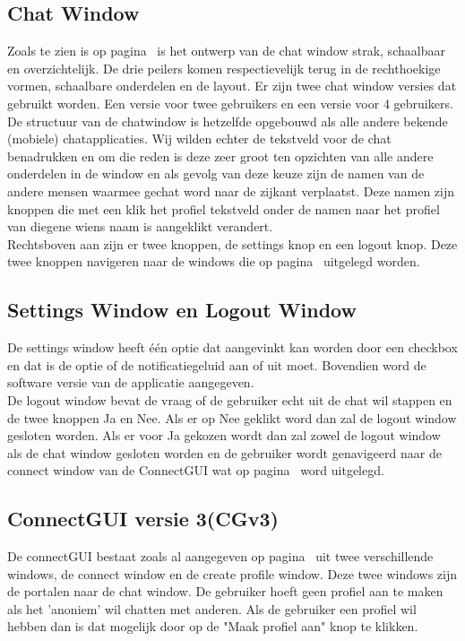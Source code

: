 \documentclass[12pt]{article}
\begin{document}
\subsection*{Chat Window}
\label{Chat Window}
Zoals te zien is op pagina~\pageref{ChGv3Chat} is het ontwerp van de chat window strak, schaalbaar en overzichtelijk. De drie peilers komen respectievelijk terug in de rechthoekige vormen, schaalbare onderdelen en de layout. Er zijn twee chat window versies dat gebruikt worden. Een versie voor twee gebruikers en een versie voor 4 gebruikers.\\

\noindent De structuur van de chatwindow is hetzelfde opgebouwd als alle andere bekende (mobiele) chatapplicaties. Wij wilden echter de tekstveld voor de chat benadrukken en om die reden is deze zeer groot ten opzichten van alle andere onderdelen in de window en als gevolg van deze keuze zijn de namen van de andere mensen waarmee gechat word naar de zijkant verplaatst. Deze namen zijn knoppen die met een klik het profiel tekstveld onder de namen naar het profiel van diegene wiens naam is aangeklikt verandert. \\

\noindent Rechtsboven aan zijn er twee knoppen, de settings knop en een logout knop. Deze twee knoppen navigeren naar de windows die op pagina~\pageref{LWSW} uitgelegd worden.

\subsection*{Settings Window en Logout Window}
\label{LWSW}
De settings window heeft \'e\'en optie dat aangevinkt kan worden door een checkbox en dat is de optie of de notificatiegeluid aan of uit moet. Bovendien word de software versie van de applicatie aangegeven.
\\

\noindent De logout window bevat de vraag of de gebruiker echt uit de chat wil stappen en de twee knoppen Ja en Nee. Als er op Nee geklikt word dan zal de logout window gesloten worden. Als er voor Ja gekozen wordt dan zal zowel de logout window als de chat window gesloten worden en de gebruiker wordt genavigeerd naar de connect window van de ConnectGUI wat op pagina~\pageref{connectie}  word uitgelegd.

\subsection{ConnectGUI versie 3(CGv3)}
\label{ConnectGUI}
De connectGUI bestaat zoals al aangegeven op pagina~\pageref{aangegeven} uit twee verschillende windows, de connect window en de create profile window. Deze twee windows zijn de portalen naar de chat window. De gebruiker hoeft geen profiel aan te maken als het 'anoniem' wil chatten met anderen. Als de gebruiker een profiel wil hebben dan is dat mogelijk door op de "Maak profiel aan" knop te klikken.
\end{document}
